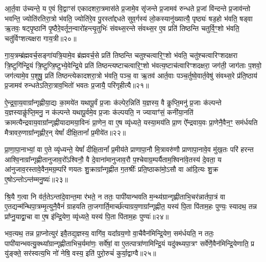आ॒र्त॒वा उ॑च्यन्ते॒ य ए॒वं वि॒द्वाꣳस॑ एकादशरा॒त्रमास॑ते प्र॒जामे॒व सृ॑जन्ते प्र॒जामव॑ रुन्धते प्र॒जां वि॑न्दन्ते प्र॒जाव॑न्तो भवन्ति॒ ज्योति॑रतिरा॒त्रो भ॑वति॒ ज्योति॑रे॒व पु॒रस्ता᳚द्दधते सुव॒र्गस्य॑ लो॒कस्यानु॑ख्यात्यै॒ पृष्ठ्यः॑ षड॒हो भ॑वति॒ षड्वा ऋ॒तवः॒ षट्पृ॒ष्ठानि॑ पृ॒ष्ठैरे॒वर्तून॒न्वारो॑हन्त्यृ॒तुभिः॑ संवथ्स॒रन्ते सं॑वथ्स॒र ए॒व प्रति॑ तिष्ठन्ति चतुर्वि॒ꣳ॒शो भ॑वति॒ चतु॑र्विꣳशत्यक्षरा गाय॒त्री॥२०॥

गा॒य॒त्रम्ब्र॑ह्मवर्च॒सङ्गा॑यत्रि॒यामे॒व ब्र॑ह्मवर्च॒से प्रति॑ तिष्ठन्ति चतुश्चत्वारि॒ꣳ॒शो भ॑वति॒ चतु॑श्चत्वारिꣳशदक्षरा त्रि॒ष्टुगि॑न्द्रि॒यं त्रि॒ष्टुप्त्रि॒ष्टुभ्ये॒वेन्द्रि॒ये प्रति॑ तिष्ठन्त्यष्टाचत्वारि॒ꣳ॒शो भ॑वत्य॒ष्टाच॑त्वारिꣳशदक्षरा॒ जग॑ती॒ जाग॑ताः प॒शवो॒ जग॑त्यामे॒व प॒शुषु॒ प्रति॑ तिष्ठन्त्येकादशरा॒त्रो भ॑वति॒ पञ्च॒ वा ऋ॒तव॑ आर्त॒वाः पञ्च॒र्तुष्वे॒वार्त॒वेषु॑ संवथ्स॒रे प्र॑ति॒ष्ठाय॑ प्र॒जामव॑ रुन्धते\-ऽतिरा॒त्राव॒भितो॑ भवतः प्र॒जायै॒ परि॑गृहीत्यै॥२१॥

{\anuvakamend[{तस्मा᳚द्गाय॒त्र्येका॒न्नप॑ञ्चा॒शच्च॑॥६॥}]}

ऐ॒न्द्र॒वा॒य॒वाग्रा᳚न्गृह्णीया॒द्यः का॒मये॑त यथापू॒र्वं प्र॒जाः क॑ल्पेर॒न्निति॑ य॒ज्ञस्य॒ वै कॢप्ति॒मनु॑ प्र॒जाः क॑ल्पन्ते य॒ज्ञस्याकॢ॑प्ति॒मनु॒ न क॑ल्पन्ते यथापू॒र्वमे॒व प्र॒जाः क॑ल्पयति॒ न ज्यायाꣳ॑सं॒ कनी॑या॒नति॑ क्रामत्यैन्द्रवाय॒वाग्रा᳚न्गृह्णीयादामया॒विनः॑ प्रा॒णेन॒ वा ए॒ष व्यृ॑ध्यते॒ यस्या॒मय॑ति प्रा॒ण ऐ᳚न्द्रवाय॒वः प्रा॒णेनै॒वैन॒ꣳ॒ सम॑र्धयति मैत्रावरु॒णाग्रा᳚न्गृह्णीर॒न् येषां᳚ दीक्षि॒तानां᳚ प्र॒मीये॑त॥२२॥

प्रा॒णा॒पा॒नाभ्यां॒ वा ए॒ते व्यृ॑ध्यन्ते॒ येषां᳚ दीक्षि॒तानां᳚ प्र॒मीय॑ते प्राणापा॒नौ मि॒त्रावरु॑णौ प्राणापा॒नावे॒व मु॑ख॒तः परि॑ हरन्त आश्वि॒नाग्रा᳚न्गृह्णीतानुजाव॒रो᳚\-ऽश्विनौ॒ वै दे॒वाना॑मानुजाव॒रौ प॒श्चेवाग्र॒म्पर्यैताम॒श्विना॑वे॒तस्य॑ दे॒वता॒ य आ॑नुजाव॒रस्तावे॒वैन॒मग्र॒म्परि॑ णयतः शु॒क्राग्रा᳚न्गृह्णीत ग॒तश्रीः᳚ प्रति॒ष्ठाका॑मो॒\-ऽसौ वा आ॑दि॒त्यः शु॒क्र ए॒षो\-ऽन्तो\-ऽन्त॑म्मनु॒ष्यः॑॥२३॥

श्रि॒यै ग॒त्वा नि व॑र्त॒ते\-ऽन्ता॑दे॒वान्त॒मा र॑भते॒ न ततः॒ पापी॑यान्भवति म॒न्थ्य॑ग्रान्गृह्णीताभि॒चर॑न्नार्तपा॒त्रं वा ए॒तद्यन्म॑न्थिपा॒त्रम्मृ॒त्युनै॒वैनं॑ ग्राहयति ता॒जगार्ति॒मार्च्छ॑त्याग्रय॒णाग्रा᳚न्गृह्णीत॒ यस्य॑ पि॒ता पि॑ताम॒हः पुण्यः॒ स्यादथ॒ तन्न प्रा᳚प्नु॒याद्वा॒चा वा ए॒ष इ॑न्द्रि॒येण॒ व्यृ॑ध्यते॒ यस्य॑ पि॒ता पि॑ताम॒हः पुण्यः॑॥२४॥

भव॒त्यथ॒ तन्न प्रा॒प्नोत्युर॑ इवै॒तद्य॒ज्ञस्य॒ वागि॑व॒ यदा᳚ग्रय॒णो वा॒चैवैन॑मिन्द्रि॒येण॒ सम॑र्धयति॒ न ततः॒ पापी॑यान्भव\-त्यु॒क्थ्या᳚ग्रान्गृह्णीताभिच॒र्यमा॑णः॒ सर्वे॑षां॒ वा ए॒तत्पात्रा॑णामिन्द्रि॒यं यदु॑क्थ्यपा॒त्रꣳ सर्वे॑णै॒वैन॑मिन्द्रि॒येणाति॒ प्र यु॑ङ्क्ते॒ सर॑स्वत्य॒भि नो॑ नेषि॒ वस्य॒ इति॑ पुरो॒रुचं॑ कुर्या॒द्वाग्वै॥२५॥

